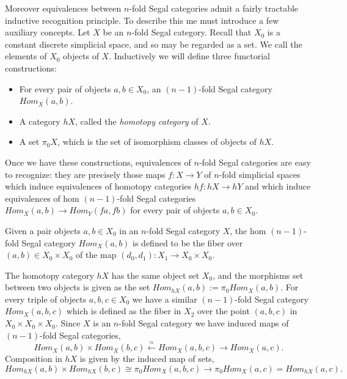 \documentclass{amsart}
\begin{document}
Moreover equivalences between $n$-fold Segal categories admit a fairly tractable inductive recognition principle. To describe this me must introduce a few auxiliary concepts. Let $X$ be an $n$-fold Segal category. Recall that $X_0$ is a constant discrete simplicial space, and so may be regarded as a set. We call the elements of $X_0$ objects of $X$. 
Inductively we will define three functorial constructions:
\begin{itemize}
	\item For every pair of objects $a,b \in X_0$, an $(n-1)$-fold Segal category $Hom_X(a,b)$.
	\item A category $\mathit{h}X$, called the {\em homotopy category} of $X$.
	\item A set $\pi_0 X$, which is the set of isomorphism classes of objects of $\mathit{h}X$. 
\end{itemize}
Once we have these constructions, equivalences of $n$-fold Segal categories are easy to recognize: they are precisely those maps $f:X \to Y$ of $n$-fold simplicial spaces which induce equivalences of homotopy categories $\mathit{h}f:\mathit{h}X \to \mathit{h}Y$ and which induce equivalences of hom $(n-1)$-fold Segal categories $Hom_X(a,b) \to Hom_Y(fa, fb)$ for every pair of objects $a,b \in X_0$. 

Given a pair objects $a,b \in X_0$ in an $n$-fold Segal category $X$, the hom $(n-1)$-fold Segal category $Hom_X(a,b)$ is defined to be the fiber over $(a,b) \in X_0 \times X_0$ of the map $(d_0, d_1): X_1 \to X_0 \times X_0$.  
\begin{center}
\end{center}
The homotopy category $\mathit{h}X$ has the same object set $X_0$, and the morphisms set between two objects is given as the set $Hom_{\mathit{h}X}(a,b) := \pi_0 Hom_X(a,b)$. For every triple of objects $a,b,c \in X_0$ we have a similar $(n-1)$-fold Segal category $Hom_X(a,b,c)$ which is defined as the fiber in $X_2$ over the point $(a,b,c)$ in $X_0 \times X_0 \times X_0$. Since $X$ is an $n$-fold Segal category we have induced maps of $(n-1)$-fold Segal categories,
\begin{equation*}
	Hom_X(a,b) \times Hom_X(b,c) \stackrel{\simeq}{\longleftarrow} Hom_X(a,b,c) \stackrel{}{\longrightarrow} Hom_X(a,c).
\end{equation*}
Composition in $\mathit{h}X$ is given by the induced map of sets,
\begin{equation*}
	 Hom_{\mathit{h}X}(a,b) \times Hom_{\mathit{h}X}(b,c) \cong \pi_0 Hom_X(a,b,c)\to \pi_0 Hom_X(a,c) = Hom_{\mathit{h}X}(a,c).
\end{equation*}
\end{document}

